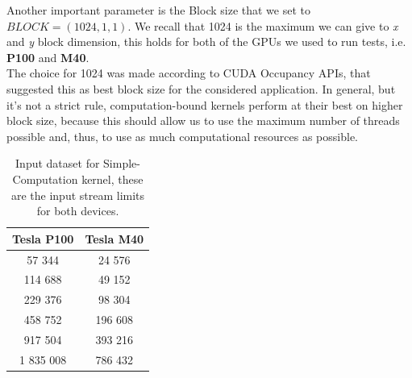 Another important parameter is the Block size that we set to \(BLOCK = (1024, 1, 1)\). We recall that 1024 is the maximum we can give to \textit{x} and \textit{y} block dimension, this holds for both of the GPUs we used to run tests, i.e. \textbf{P100} and \textbf{M40}.\\
The choice for 1024 was made according to CUDA Occupancy APIs, that suggested this as best block size for the considered application. In general, but it's not a strict rule, computation-bound kernels perform at their best on higher block size, because this should allow us to use the maximum number of threads possible and, thus, to use as much computational resources as possible.\\
	\begin{table}	
		\centering
		\begin{tabular}{| c c |} 
			\hline
			\textbf{Tesla P100} & \textbf{Tesla M40} \\ [0.5ex] 
			\hline\hline
			
			57 344 & 24 576  \\ 
			114 688	& 49 152  \\ 
			229 376 & 98 304 \\
			458 752 & 196 608 \\
			917 504 & 393 216 \\
			1 835 008 & 786 432 \\
			\hline

		\end{tabular}
		\caption{Input dataset for Simple-Computation kernel, these are the input stream limits for both devices.}	
		\label{tab:cosdata}		
	\end{table}

